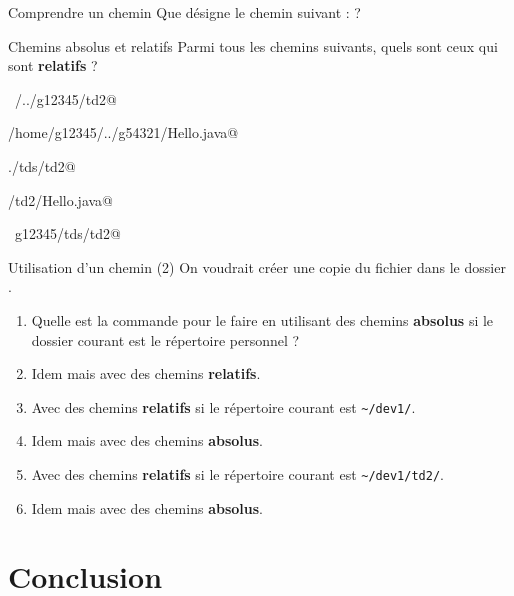 \documentclass[a4paper,11pt]{style-esi/td}
\begin{document}
		\begin{Exercice}{Comprendre un chemin}
			Que désigne le chemin suivant :
			 ?
		\end{Exercice}

		\begin{Exercice}{Chemins absolus et relatifs}
			Parmi tous les chemins suivants, quels sont ceux qui sont 
			\textbf{relatifs} ?			
			\begin{selectmany} 
			\item \verb@~/../g12345/td2@
			\item \verb@/home/g12345/../g54321/Hello.java@
			\item \verb@./tds/td2@
			\item \verb@tds/td2/Hello.java@
			\item \verb@~g12345/tds/td2@
			\end{selectmany} 
        \end{Exercice}

		\begin{Exercice}{Utilisation d'un chemin (2)}
			On voudrait créer une copie du fichier 
			dans le dossier .
			\begin{enumerate}
			\item 
				Quelle est la commande pour le faire en utilisant
				des chemins \textbf{absolus} si le dossier courant
				est le répertoire personnel ?
				\textbox{2em}
			\item 
				Idem mais avec des chemins \textbf{relatifs}.
				\textbox{2em}
			\item 
				Avec des chemins \textbf{relatifs}
				si le répertoire courant est \verb|~/dev1/|.
				\textbox{2em}
			\item 
				Idem mais avec des chemins \textbf{absolus}.
				\textbox{2em}
			\item 
				Avec des chemins \textbf{relatifs}
				si le répertoire courant est \verb|~/dev1/td2/|.
				\textbox{2em}
			\item 
				Idem mais avec des chemins \textbf{absolus}.
				\textbox{2em}
		\end{enumerate}
		\end{Exercice}



\section{Conclusion}
\end{document}
